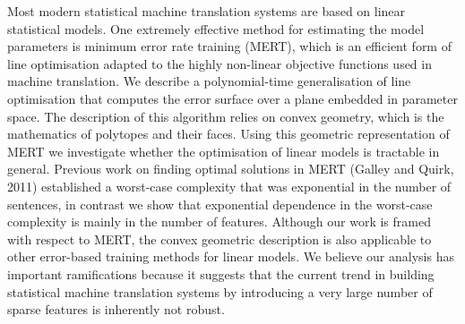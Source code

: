 Most modern statistical machine translation systems are based on linear statistical models. One extremely effective method for estimating the model parameters is minimum error rate training (MERT), which is an efficient form of line optimisation adapted to the highly non-linear objective functions used in machine translation. We describe a polynomial-time generalisation of line optimisation that computes the error surface over a plane embedded in parameter space. The description of this algorithm relies on convex geometry, which is the mathematics of polytopes and their faces. Using this geometric representation of MERT we investigate whether the optimisation of linear models is tractable in general. Previous work on finding optimal solutions in MERT (Galley and Quirk, 2011) established a worst-case complexity that was exponential in the number of sentences, in contrast we show that exponential dependence in the worst-case complexity is mainly in the number of features. Although our work is framed with respect to MERT, the convex geometric description is also applicable to other error-based training methods for linear models. We believe our analysis has important ramifications because it suggests that the current trend in building statistical machine translation systems by introducing a very large number of sparse features is inherently not robust.
